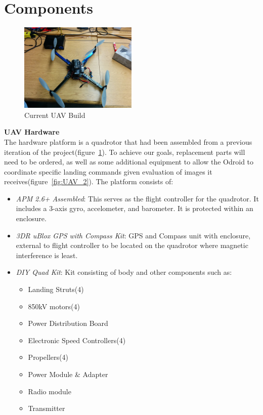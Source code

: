 \documentclass[11pt]{article}
\begin{document}
\section*{Components}
\begin{figure}[h]
\centering
\includegraphics[width=0.5\textwidth]{UAV}
\caption{Current UAV Build}
\label{fig:UAV}
\end{figure}


\noindent \textbf{UAV Hardware}\\
The hardware platform is a quadrotor that had been assembled from a previous iteration of the project(figure~\ref{fig:UAV}). To achieve our goals, replacement parts will need to be ordered, as well as some additional equipment to allow the Odroid to coordinate specific landing commands given evaluation of images it receives(figure~\ref{fig:UAV_2}). The platform consists of:

\begin{itemize}
\item \textit{APM 2.6+ Assembled}: This serves as the flight controller for the quadrotor. It includes a 3-axis gyro, accelometer, and barometer. It is protected within an enclosure.
\item \textit{3DR uBlox GPS with Compass Kit}: GPS and Compass unit with enclosure, external to flight controller to be located on the quadrotor where magnetic interference is least. 
\item \textit{DIY Quad Kit}: Kit consisting of body and other components such as:
\begin{itemize}
\item Landing Struts(4)
\item 850kV motors(4)
\item Power Distribution Board
\item Electronic Speed Controllers(4)
\item Propellers(4)
\item Power Module \& Adapter
\item Radio module
\item Transmitter
\end{itemize}
\end{itemize}
\end{document}
